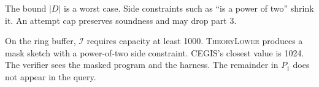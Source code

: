 The bound \(|D|\) is a worst case. Side constraints such as ``is a power of
two'' shrink it. An attempt cap preserves soundness and may drop part 3.

On the ring buffer, \(\mathcal{I}\) requires capacity at least 1000.
\textsc{TheoryLower} produces a mask sketch with a power-of-two side
constraint. CEGIS's closest value is 1024. The verifier sees the masked
program and the harness. The remainder in \(P_1\) does not appear in the
query.
